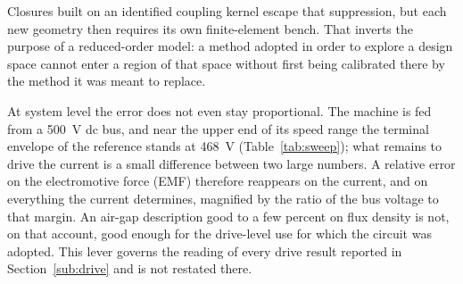 \documentclass[10pt,a4paper,twocolumn]{article}
\theoremstyle{plain}
\theoremstyle{remark}
\begin{document}
Closures built on an identified coupling kernel escape that suppression,
but each new geometry then requires its own finite-element bench. That
inverts the purpose of a reduced-order model: a method adopted in order
to explore a design space cannot enter a region of that space without
first being calibrated there by the method it was meant to replace.

At system level the error does not even stay proportional. The machine
is fed from a \SI{500}{\volt} dc bus, and near the upper end of its
speed range the terminal envelope of the reference stands at
\SI{468}{\volt} (Table~\ref{tab:sweep}); what remains to drive the
current is a small difference between two large numbers. A relative
error on the electromotive force (EMF) therefore reappears on the current, and
on everything the current determines, magnified by the ratio of the bus
voltage to that margin. An air-gap description good to a few percent on
flux density is not, on that account, good enough for the drive-level
use for which the circuit was adopted. This lever governs the reading of
every drive result reported in Section~\ref{sub:drive} and is not
restated there.
\end{document}
